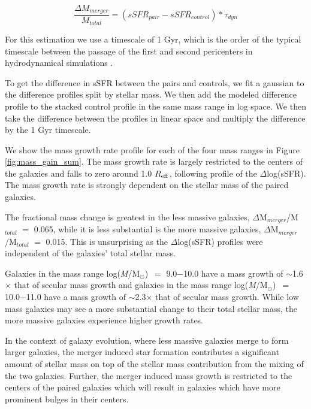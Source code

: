 \documentclass[iop,revtex4,twocolumn,apj,numberedappendix,appendixfloats]{emulateapj}
\newcommand{\reff}{$R_{\rm eff}$}
\newcommand{\logm}{log({\it M}/M$_{\odot}$)}
\begin{document}
\begin{equation}
\frac{\Delta M_{merger}}{M_{total}} = \left(sSFR_{pair} - sSFR_{control}\right) * \tau_{dyn}
\end{equation}

For this estimation we use a timescale of 1 Gyr, which is the order of the typical timescale between the passage of the first and second pericenters in hydrodynamical simulations \citep{Boylan-Kolchin:2008}. 

To get the difference in sSFR between the pairs and controls, we fit a gaussian to the difference profiles split by stellar mass. We then add the modeled difference profile to the stacked control profile in the same mass range in log space. We then take the difference between the profiles in linear space and multiply the difference by the 1 Gyr timescale. 

We show the mass growth rate profile for each of the four mass ranges in Figure \ref{fig:mass_gain_sum}. The mass growth rate is largely restricted to the centers of the galaxies and falls to zero around 1.0 \reff, following profile of the $\Delta$log(sSFR). The mass growth rate is strongly dependent on the stellar mass of the paired galaxies. 

The fractional mass change is greatest in the less massive galaxies, $\Delta$M$_{merger}$/M$_{total}$ $=$ 0.065, while it is less substantial is the more massive galaxies, $\Delta$M$_{merger}$/M$_{total}$ $=$ 0.015. This is unsurprising as the $\Delta$log(sSFR) profiles were independent of the galaxies' total stellar mass. 

Galaxies in the mass range \logm\ $=$ 9.0$-$10.0 have a mass growth of $\sim$1.6$\times$ that of secular mass growth and galaxies in the mass range \logm\ $=$ 10.0$-$11.0 have a mass growth of $\sim$2.3$\times$ that of secular mass growth. While low mass galaxies may see a more substantial change to their total stellar mass, the more massive galaxies experience higher growth rates.

In the context of galaxy evolution, where less massive galaxies merge to form larger galaxies, the merger induced star formation contributes a significant amount of stellar mass on top of the stellar mass contribution from the mixing of the two galaxies. Further, the merger induced mass growth is restricted to the centers of the paired galaxies which will result in galaxies which have more prominent bulges in their centers.  

\end{document}
